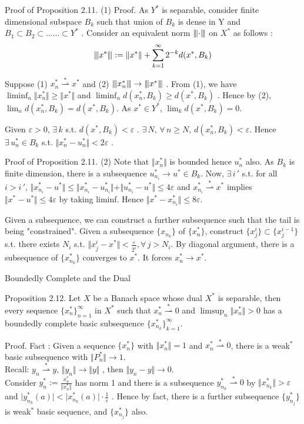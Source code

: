 \documentclass{beamer}
\newcommand{\xns}{\{x_n^*\}_{n=1}^\infty}
\newcommand{\wsconverge}{\mathop{\rightharpoonup}\limits^{*}}
\begin{document}
\begin{frame}{Proof of Proposition 2.11. (1)}
    Proof. As $Y^*$ is separable, consider finite dimensional subspace $B_k$ such that union of $B_k$ is dense in Y and $B_1\subset B_2\subset ......\subset Y^*$ .
    Consider an equivalent norm $\left\lvert\kern-0.25ex\left\lvert\kern-0.25ex\left\lvert \cdot \right\rvert\kern-0.25ex\right\rvert\kern-0.25ex\right\rvert$ on $X^*$ as follows :
    $$\left\lvert\kern-0.25ex\left\lvert\kern-0.25ex\left\lvert x^* \right\rvert\kern-0.25ex\right\rvert\kern-0.25ex\right\rvert := \Vert x^* \Vert + \sum_{k=1}^\infty 2^{-k}d(x^*,B_k) $$

    Suppose (1) $x_n^* \wsconverge x^*$ and (2) $\left\lvert\kern-0.25ex\left\lvert\kern-0.25ex\left\lvert x_n^* \right\rvert\kern-0.25ex\right\rvert\kern-0.25ex\right\rvert \to \left\lvert\kern-0.25ex\left\lvert\kern-0.25ex\left\lvert x^* \right\rvert\kern-0.25ex\right\rvert\kern-0.25ex\right\rvert$ . From (1), we have $\liminf_n \Vert x_n^*\Vert \geq \Vert x^*\Vert$ and $\liminf_n d(x_n^*,B_k) \geq d(x^*,B_k)$ . Hence by (2), $\lim_n d(x_n^*,B_k) = d(x^*,B_k)$. As $x^*\in Y^*$, $\lim_k d(x^*,B_k)=0$. 

    Given $\varepsilon>0,\, \exists\, k $ s.t. $d(x^*,B_k)<\varepsilon$ . $\exists\, N,\,\forall\, n \geq N,\, d(x_n^*,B_k)<\varepsilon$. Hence $\exists\, u_n^*\in B_k$ s.t. $\Vert x_n^*-u_n^*\Vert<2\varepsilon$ .
\end{frame}
\begin{frame}{Proof of Proposition 2.11. (2)}
    Note that $\Vert x_n^* \Vert$ is bounded hence $u_n^*$ also. As $B_k$ is finite dimension, there is a subsequence $u_{n_i}^* \to u^*\in B_k$. Now, $\exists\, i\,'$ s.t. for all $ i>i\,',\, \Vert x_{n_i}^*-u^*\Vert \leq \Vert x_{n_i}^* - u_{n_i}^* \Vert + \Vert u_{n_i}^* - u^* \Vert \leq 4\varepsilon$ and $x_{n_i}^* \wsconverge x^*$ implies $\Vert x^*-u^*\Vert \leq 4\varepsilon$ by taking liminf. Hence $\Vert x^* - x_{n_i}^*\Vert \leq 8\varepsilon$.

    Given a subsequence, we can construct a further subsequence such that the tail is being "constrained". Given a subsequence $\{x_{n_k}\}$ of $\{x_n^*\}$, construct $\{x_j^i\}\subset\{x_j^{i-1}\}$ s.t. there exists $N_i$ s.t. $\Vert x_j^i-x^*\Vert < \frac{\varepsilon}{2^i} ,\forall\,j>N_i$. By diagonal argument, there is a subsequence of $\{x_{n_k}^*\}$ converges to $x^*$. It forces $x_n^* \to x^*$. 
\end{frame}
\begin{frame}{Boundedly Complete and the Dual}
    \begin{block}{Proposition 2.12.}
        Let $X$ be a Banach space whose dual $X^*$ is separable, then every sequence $\xns$ in $X^*$ such that $x_n^* \wsconverge 0$ and $\limsup_n \Vert x_n^* \Vert >0$ has a boundedly complete basic subsequence $\{x_{n_k}^*\}_{k=1}^\infty$.
    \end{block}
    Proof. Fact :
    Given a sequence $\{x_n^*\}$ with $\Vert x_n^* \Vert =1$ and $x_n^*\wsconverge 0$, there is a weak$^*$ basic subsequence with $\Vert P_n^*\Vert \to 1$.\\
    Recall: $y_n\wsconverge y,\, \Vert y_n\Vert \to \Vert y \Vert$ , then $\Vert y_n - y\Vert \to 0$.\\
    Consider $y_n^*:= \frac{x_n^*}{\Vert x_n^* \Vert} $ has norm 1 and there is a subsequence $y_{n_k}^*\wsconverge0$ by $\Vert x_{n_k}^* \Vert >\varepsilon$ and $\vert y_{n_k}^*(a)\vert < \vert x_{n_k}^*(a)\vert \cdot \frac{1}{\varepsilon}$ . Hence by fact, there is a further subsequence $\{y_{n_j}^*\}$ is weak$^*$ basic sequence, and $\{x_{n_j}^*\}$ also.    
\end{frame}
\end{document}
